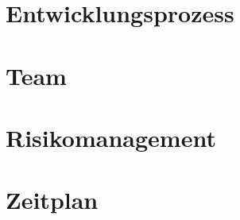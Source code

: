 \section{Entwicklungsprozess}
\label{sec:entwicklungsprozess}



\section{Team}
\label{sec:team}



\section{Risikomanagement}
\label{sec:risikomanagement}


\section{Zeitplan}
\label{sec:zeitplan}

